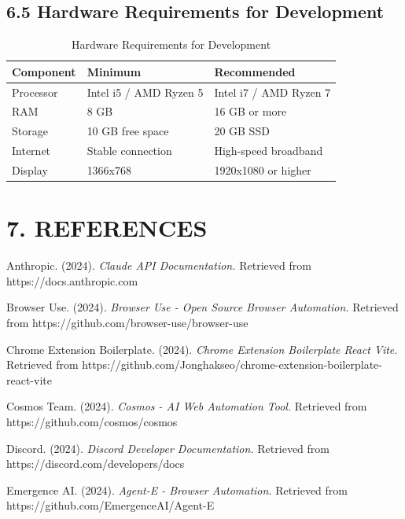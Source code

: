 \documentclass[12pt,a4paper]{article}
\begin{document}
\subsection*{\textbf{6.5 Hardware Requirements for Development}}

\begin{table}[h]
\centering
\begin{tabular}{|l|l|l|}
\hline
\textbf{Component} & \textbf{Minimum} & \textbf{Recommended} \\
\hline
Processor & Intel i5 / AMD Ryzen 5 & Intel i7 / AMD Ryzen 7 \\
\hline
RAM & 8 GB & 16 GB or more \\
\hline
Storage & 10 GB free space & 20 GB SSD \\
\hline
Internet & Stable connection & High-speed broadband \\
\hline
Display & 1366x768 & 1920x1080 or higher \\
\hline
\end{tabular}
\caption{Hardware Requirements for Development}
\end{table}

\newpage

\section*{\textbf{7. REFERENCES}}

\setlength{\parindent}{0pt}
\setlength{\leftskip}{0.5in}
\setlength{\parskip}{0.25cm}

\noindent Anthropic. (2024). \textit{Claude API Documentation.} Retrieved from https://docs.anthropic.com

\noindent Browser Use. (2024). \textit{Browser Use - Open Source Browser Automation.} Retrieved from https://github.com/browser-use/browser-use

\noindent Chrome Extension Boilerplate. (2024). \textit{Chrome Extension Boilerplate React Vite.} Retrieved from https://github.com/Jonghakseo/chrome-extension-boilerplate-react-vite

\noindent Cosmos Team. (2024). \textit{Cosmos - AI Web Automation Tool.} Retrieved from https://github.com/cosmos/cosmos

\noindent Discord. (2024). \textit{Discord Developer Documentation.} Retrieved from https://discord.com/developers/docs

\noindent Emergence AI. (2024). \textit{Agent-E - Browser Automation.} Retrieved from https://github.com/EmergenceAI/Agent-E
\end{document}
